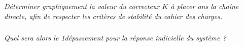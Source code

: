 \documentclass[10pt,fleqn]{article} %
\begin{document}
\begin{multicols}{2}
\subparagraph{}\textit{Déterminer graphiquement la valeur du correcteur $K$ à placer ans la chaîne directe, afin de respecter les critères de stabilité du cahier des charges.}
\ifprof
\begin{corrige}
\end{corrige}
\else
\fi

\subparagraph{}\textit{Quel sera alors le 1\ier dépassement pour la réponse indicielle du système ?}
\ifprof
\begin{corrige}
\end{corrige}
\else
\fi

\end{multicols}
%
%
%
\end{document}
